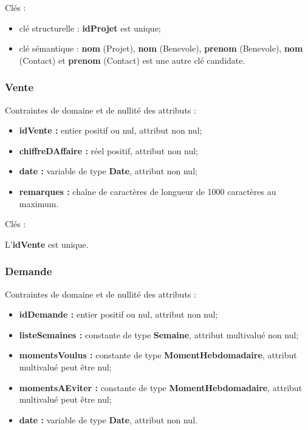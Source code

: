Clés : 
\begin{itemize}
\item clé structurelle : \textbf{idProjet} est unique;
\item clé sémantique : \textbf{nom} (Projet), \textbf{nom} (Benevole), \textbf{prenom} (Benevole), \textbf{nom} (Contact) et \textbf{prenom} (Contact) est une autre clé candidate. \\ 
\end{itemize}

\subsubsection*{Vente}
Contraintes de domaine et de nullité des attributs :
\begin{itemize}
 	\item \textbf{idVente :} entier positif ou nul, attribut non nul;
	\item \textbf{chiffreDAffaire :} réel positif, attribut non nul;
	\item \textbf{date :} variable de type \textbf{Date}, attribut non nul;
	\item \textbf{remarques :} chaîne de caractères de longueur de 1000 caractères au maximum. \\  
\end{itemize} 

Clés : 

L'\textbf{idVente} est unique.\\

\subsubsection*{Demande}
Contraintes de domaine et de nullité des attributs :
\begin{itemize}
	\item \textbf{idDemande :} entier positif ou nul, attribut non nul;
 	\item \textbf{listeSemaines :} constante de type \textbf{Semaine}, attribut multivalué non nul; 
	\item \textbf{momentsVoulus :} constante de type \textbf{MomentHebdomadaire}, attribut multivalué peut être nul;
	\item \textbf{momentsAEviter :} constante de type \textbf{MomentHebdomadaire}, attribut multivalué peut être nul;
	\item \textbf{date :} variable de type \textbf{Date}, attribut non nul.\\
\end{itemize} 

